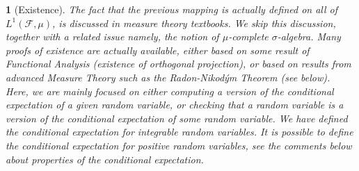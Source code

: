 \documentclass[12pt,a4paper]{amsart}
\theoremstyle{plain}%
\newtheorem{npar}{}%
\theoremstyle{definition}
\theoremstyle{remark}
\begin{document}
\begin{npar}[Existence] \normalfont The fact that the previous mapping
  is actually defined on all of $L^1(\mathcal F,\mu)$, is discussed in
  measure theory textbooks. We skip this discussion, together with a related issue namely, the notion of $\mu$-complete $\sigma$-algebra. Many proofs of existence are actually available, either based on some result of Functional Analysis (existence of orthogonal projection), or based on results from advanced Measure Theory such as the Radon-Nikod\'ym Theorem (see below). Here, we are mainly focused on either \emph{computing} a version of the conditional expectation of a given random variable, or \emph{checking} that a random variable is a version of the conditional expectation of some random variable. We have defined the conditional expectation for integrable random variables. It is possible to define the conditional expectation for positive random variables, see the comments below about properties of the conditional expectation.
\end{npar}
\end{document}
